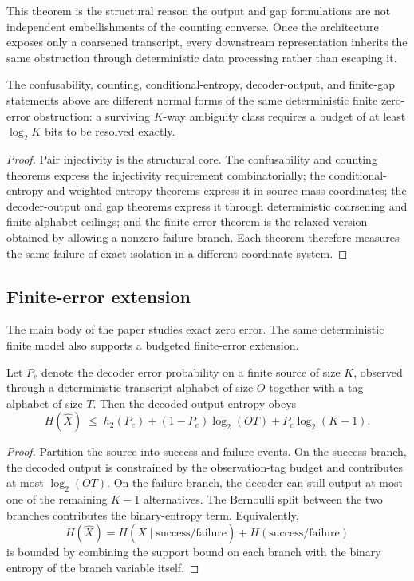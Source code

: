 This theorem is the structural reason the output and gap formulations are not independent embellishments of the counting converse. Once the architecture exposes only a coarsened transcript, every downstream representation inherits the same obstruction through deterministic data processing rather than escaping it.

\begin{theorem}\label{thm:equivalence-viewpoint}
The confusability, counting, conditional-entropy, decoder-output, and finite-gap statements above are different normal forms of the same deterministic finite zero-error obstruction: a surviving $K$-way ambiguity class requires a budget of at least $\log_2 K$ bits to be resolved exactly.
\end{theorem}

\begin{proof}
Pair injectivity is the structural core. The confusability and counting theorems express the injectivity requirement combinatorially; the conditional-entropy and weighted-entropy theorems express it in source-mass coordinates; the decoder-output and gap theorems express it through deterministic coarsening and finite alphabet ceilings; and the finite-error theorem is the relaxed version obtained by allowing a nonzero failure branch. Each theorem therefore measures the same failure of exact isolation in a different coordinate system.
\end{proof}

\subsection{Finite-error extension}\label{sec:finite-error-extension}

The main body of the paper studies exact zero error. The same deterministic finite model also supports a budgeted finite-error extension.

\begin{theorem}\label{thm:finite-error-budgeted}
Let $P_e$ denote the decoder error probability on a finite source of size $K$, observed through a deterministic transcript alphabet of size $O$ together with a tag alphabet of size $T$. Then the decoded-output entropy obeys
\[
H(\hat X)
\;\le\;
h_2(P_e) + (1-P_e)\log_2 (OT) + P_e \log_2 (K-1).
\]
\end{theorem}

\begin{proof}
Partition the source into success and failure events. On the success branch, the decoded output is constrained by the observation-tag budget and contributes at most $\log_2(OT)$. On the failure branch, the decoder can still output at most one of the remaining $K-1$ alternatives. The Bernoulli split between the two branches contributes the binary-entropy term. Equivalently,
\[
H(\hat X)=H(\hat X \mid \text{success/failure}) + H(\text{success/failure})
\]
is bounded by combining the support bound on each branch with the binary entropy of the branch variable itself.
\end{proof}

